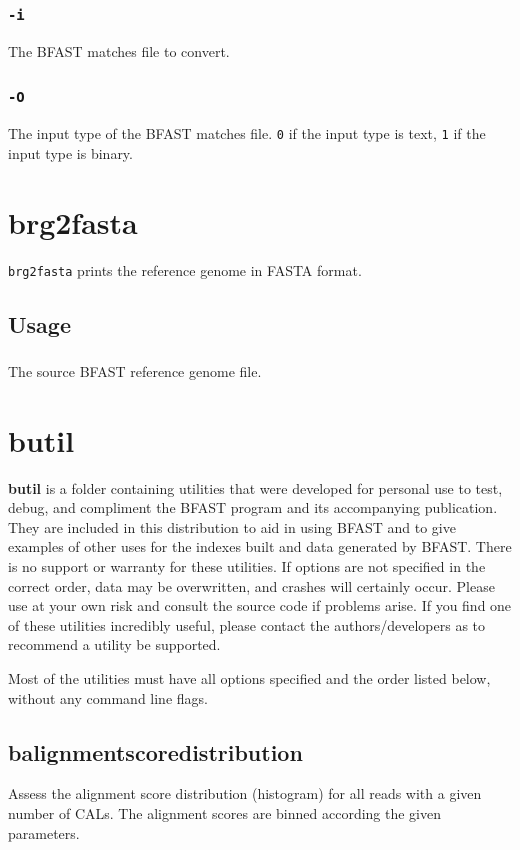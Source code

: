 \documentclass[a4paper,12pt]{book}
\newcommand{\TT}[1]{{\tt #1}} %
\newcommand{\BF}[1]{{\bf #1}} %
\newcommand{\BRGF}{BFAST reference genome file} %
\newcommand{\BMF}{BFAST matches file} %
\begin{document}
\subsubsection{\TT{-i}}
The \BMF{} to convert.
\subsubsection{\TT{-O}}
The input type of the \BMF{}. 
\TT{0} if the input type is text, \TT{1} if the input type is binary.

\section{brg2fasta}
\label{sec:brg2fasta}
\TT{brg2fasta} prints the reference genome in FASTA format.
\subsection{Usage}
\subsubsection{\TT{<bfast reference genome file>}}
The source \BRGF{}.

\section{butil}
\label{sec:butil}
\BF{butil} is a folder containing utilities that were developed for personal use to test, debug, and compliment the BFAST program and its accompanying publication.  
They are included in this distribution to aid in using BFAST and to give examples of other uses for the indexes built and data generated by BFAST.
There is no support or warranty for these utilities.  
If options are not specified in the correct order, data may be overwritten, and crashes will certainly occur.  
Please use at your own risk and consult the source code if problems arise.  
If you find one of these utilities incredibly useful, please contact the authors/developers as to recommend a utility be supported.

Most of the utilities must have all options specified and the order listed below, without any command line flags. 

\subsection{balignmentscoredistribution}
\label{sec:balignmentscoredistribution}
Assess the alignment score distribution (histogram) for all reads with a given number of CALs.
The alignment scores are binned according the given parameters.
\end{document}
